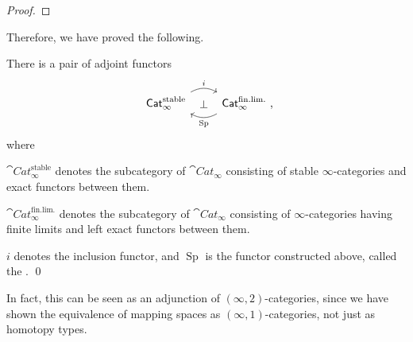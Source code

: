 \begin{proof}
    \nyw
\end{proof}

Therefore, we have proved the following.

\begin{theorem}
    There is a pair of adjoint functors 
    \[\begin{tikzcd}
        \cat{Cat}_{\infty}^{\mathrm{stable}}
        \ar[r,bend left,start anchor=north east,end anchor=north west,"i"]
        \ar[r,phantom,"\bot"] &
        \cat{Cat}_{\infty}^{\mathrm{fin.lim.}}\rlap{\ ,}
        \ar[l,bend left,start anchor=south west,end anchor=south east,"\operatorname{Sp}"]
    \end{tikzcd}\]
    where
    \begin{itms}
        \item $\cat{Cat}_{\infty}^{\mathrm{stable}}$
        denotes the subcategory of $\cat{Cat}_\infty$
        consisting of stable $\infty$-categories and exact functors between them.
        \item $\cat{Cat}_{\infty}^{\mathrm{fin.lim.}}$
        denotes the subcategory of $\cat{Cat}_\infty$
        consisting of $\infty$-categories having finite limits
        and left exact functors between them.
        \item $i$ denotes the inclusion functor,
        and $\operatorname{Sp}$ is the functor constructed above,
        called the . \qed
    \end{itms}
\end{theorem}

In fact, this can be seen as an adjunction of $(\infty,2)$-categories,
since we have shown the equivalence of mapping spaces as $(\infty,1)$-categories,
not just as homotopy types.
